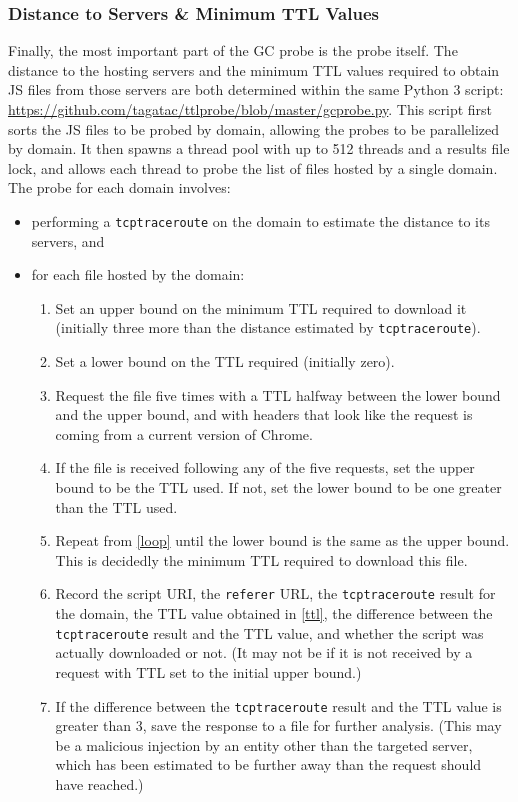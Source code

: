 \subsubsection{Distance to Servers \& Minimum TTL Values}\label{distance-ttl}
Finally, the most important part of the GC probe is the probe itself.
The distance to the hosting servers and the minimum TTL values required to obtain JS files from those servers are both determined within the same Python 3 script: \url{https://github.com/tagatac/ttlprobe/blob/master/gcprobe.py}.
This script first sorts the JS files to be probed by domain, allowing the probes to be parallelized by domain.
It then spawns a thread pool with up to 512 threads and a results file lock, and allows each thread to probe the list of files hosted by a single domain.
The probe for each domain involves:
\begin{itemize}\addtolength{\itemsep}{-.35\baselineskip}
	\item performing a \texttt{tcptraceroute} on the domain to estimate the distance to its servers, and
	\item for each file hosted by the domain:
	\begin{enumerate}
		\item Set an upper bound on the minimum TTL required to download it (initially three more than the distance estimated by \texttt{tcptraceroute}).
		\item Set a lower bound on the TTL required (initially zero).
		\item\label{loop} Request the file five times with a TTL halfway between the lower bound and the upper bound, and with headers that look like the request is coming from a current version of Chrome.
		\item If the file is received following any of the five requests, set the upper bound to be the TTL used.
			If not, set the lower bound to be one greater than the TTL used.
		\item\label{ttl} Repeat from \ref{loop} until the lower bound is the same as the upper bound.
			This is decidedly the minimum TTL required to download this file.
		\item Record the script URI, the \texttt{referer} URL, the \texttt{tcptraceroute} result for the domain, the TTL value obtained in \ref{ttl}, the difference between the \texttt{tcptraceroute} result and the TTL value, and whether the script was actually downloaded or not.
			(It may not be if it is not received by a request with TTL set to the initial upper bound.)
		\item If the difference between the \texttt{tcptraceroute} result and the TTL value is greater than 3, save the response to a file for further analysis.
			(This may be a malicious injection by an entity other than the targeted server, which has been estimated to be further away than the request should have reached.)
	\end{enumerate}
\end{itemize}
